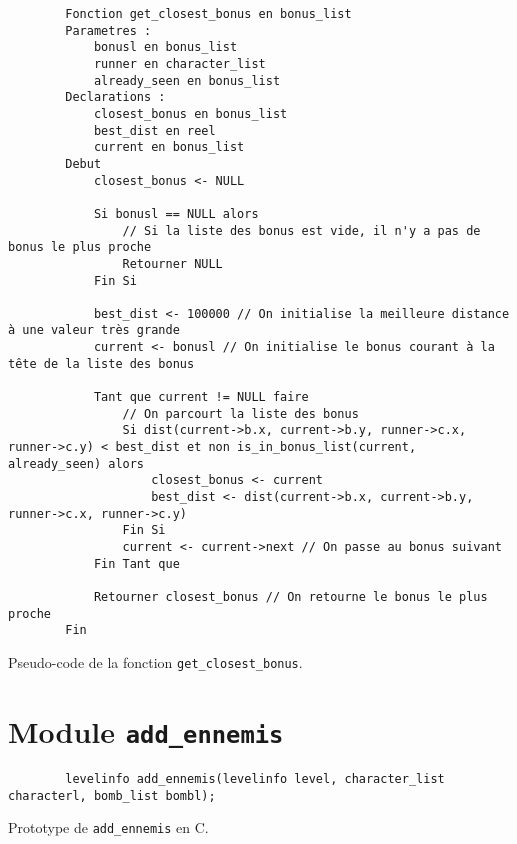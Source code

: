 \begin{listing}[!htpb]
    \begin{verbatim}
        Fonction get_closest_bonus en bonus_list
        Parametres :
            bonusl en bonus_list
            runner en character_list
            already_seen en bonus_list
        Declarations :
            closest_bonus en bonus_list
            best_dist en reel
            current en bonus_list
        Debut
            closest_bonus <- NULL

            Si bonusl == NULL alors
                // Si la liste des bonus est vide, il n'y a pas de bonus le plus proche
                Retourner NULL
            Fin Si

            best_dist <- 100000 // On initialise la meilleure distance à une valeur très grande
            current <- bonusl // On initialise le bonus courant à la tête de la liste des bonus

            Tant que current != NULL faire
                // On parcourt la liste des bonus
                Si dist(current->b.x, current->b.y, runner->c.x, runner->c.y) < best_dist et non is_in_bonus_list(current, already_seen) alors
                    closest_bonus <- current
                    best_dist <- dist(current->b.x, current->b.y, runner->c.x, runner->c.y)
                Fin Si
                current <- current->next // On passe au bonus suivant
            Fin Tant que

            Retourner closest_bonus // On retourne le bonus le plus proche
        Fin
    \end{verbatim}
    \caption{Pseudo-code de la fonction \texttt{get\_closest\_bonus}.}
    \label{listing:c-get_closest_bonus}
\end{listing}

\newpage

\section{Module \texttt{add\_ennemis}}

\begin{listing}[!htpb]
    \begin{verbatim}
        levelinfo add_ennemis(levelinfo level, character_list characterl, bomb_list bombl);
    \end{verbatim}
    \caption{Prototype de \texttt{add\_ennemis} en C.}
    \label{listing:c-add_ennemis-prototype}
\end{listing}

